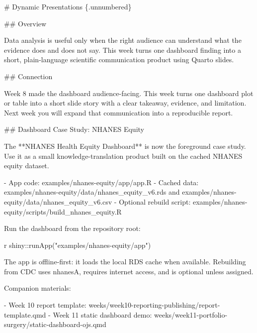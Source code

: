 \documentclass[
  letterpaper,
  DIV=11,
  numbers=noendperiod,
  oneside]{scrreprt}
\newenvironment{Shaded}{\begin{snugshade}}{\end{snugshade}}
\newcommand{\FunctionTok}[1]{\textcolor[rgb]{0.28,0.35,0.67}{#1}}
\newcommand{\InformationTok}[1]{\textcolor[rgb]{0.37,0.37,0.37}{#1}}
\newcommand{\NormalTok}[1]{\textcolor[rgb]{0.00,0.23,0.31}{#1}}
\newcommand{\SpecialCharTok}[1]{\textcolor[rgb]{0.37,0.37,0.37}{#1}}
\newcommand{\SpecialStringTok}[1]{\textcolor[rgb]{0.13,0.47,0.30}{#1}}
\newcommand{\StringTok}[1]{\textcolor[rgb]{0.13,0.47,0.30}{#1}}
\begin{document}
\begin{Shaded}
\begin{Highlighting}[numbers=left,,]
\FunctionTok{\# Dynamic Presentations \{.unnumbered\}}


\FunctionTok{\#\# Overview}

\NormalTok{Data analysis is useful only when the right audience can understand what the evidence does and does not say. This week turns one dashboard finding into a short, plain{-}language scientific communication product using Quarto slides.}

\FunctionTok{\#\# Connection}

\NormalTok{Week 8 made the dashboard audience{-}facing. This week turns one dashboard plot or table into a short slide story with a clear takeaway, evidence, and limitation. Next week you will expand that communication into a reproducible report.}

\FunctionTok{\#\# Dashboard Case Study: NHANES Equity}

\NormalTok{The **NHANES Health Equity Dashboard** is now the foreground case study. Use it as a small knowledge{-}translation product built on the cached NHANES equity dataset.}

\SpecialStringTok{{-} }\NormalTok{App code: }\InformationTok{\textasciigrave{}examples/nhanes{-}equity/app/app.R\textasciigrave{}}
\SpecialStringTok{{-} }\NormalTok{Cached data: }\InformationTok{\textasciigrave{}examples/nhanes{-}equity/data/nhanes\_equity\_v6.rds\textasciigrave{}}\NormalTok{ and }\InformationTok{\textasciigrave{}examples/nhanes{-}equity/data/nhanes\_equity\_v6.csv\textasciigrave{}}
\SpecialStringTok{{-} }\NormalTok{Optional rebuild script: }\InformationTok{\textasciigrave{}examples/nhanes{-}equity/scripts/build\_nhanes\_equity.R\textasciigrave{}}

\NormalTok{Run the dashboard from the repository root:}

\InformationTok{\textasciigrave{}\textasciigrave{}\textasciigrave{}r}
\NormalTok{shiny}\SpecialCharTok{::}\FunctionTok{runApp}\NormalTok{(}\StringTok{"examples/nhanes{-}equity/app"}\NormalTok{)}
\InformationTok{\textasciigrave{}\textasciigrave{}\textasciigrave{}}

\NormalTok{The app is offline{-}first: it loads the local RDS cache when available. Rebuilding from CDC uses }\InformationTok{\textasciigrave{}nhanesA\textasciigrave{}}\NormalTok{, requires internet access, and is optional unless assigned.}

\NormalTok{Companion materials:}

\SpecialStringTok{{-} }\NormalTok{Week 10 report template: }\InformationTok{\textasciigrave{}weeks/week10{-}reporting{-}publishing/report{-}template.qmd\textasciigrave{}}
\SpecialStringTok{{-} }\NormalTok{Week 11 static dashboard demo: }\InformationTok{\textasciigrave{}weeks/week11{-}portfolio{-}surgery/static{-}dashboard{-}ojs.qmd\textasciigrave{}}



\end{Highlighting}
\end{Shaded}
\end{document}
